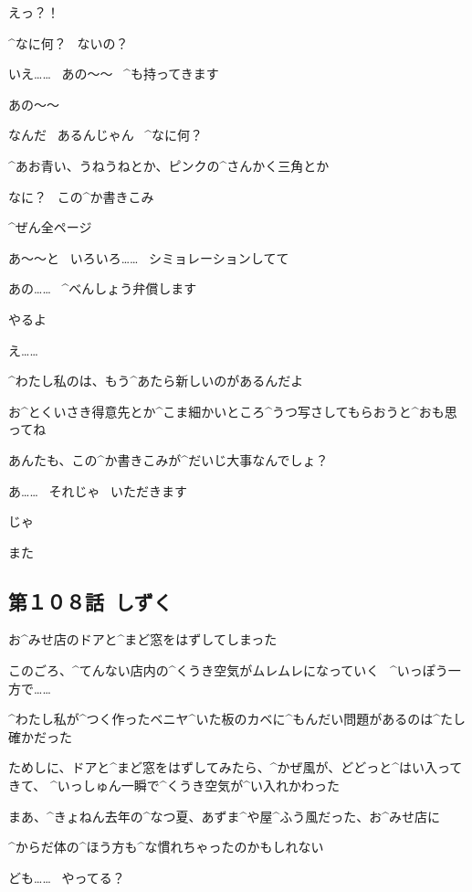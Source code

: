 \Alpha えっ？！

\Maruko ^{なに}{何}？
\ ないの？

\Alpha いえ……
\ あの〜〜
\ ^{も}{持}ってきます

\page[114]
\Alpha あの〜〜

\Maruko なんだ
\ あるんじゃん
\ ^{なに}{何}？

\Maruko ^{あお}{青}い、うねうねとか、ピンクの^{さんかく}{三角}とか

\Maruko なに？
\ この^{か}{書}きこみ

\Maruko ^{ぜん}{全}ページ

\Alpha あ〜〜と
\ いろいろ……
\ シミョレーションしてて

\page[115]
\Alpha あの……
\ ^{べんしょう}{弁償}します

\Maruko やるよ

\Alpha え……

\Maruko ^{わたし}{私}のは、もう^{あたら}{新}しいのがあるんだよ

\Maruko お^{とくいさき}{得意先}とか^{こま}{細}かいところ^{うつ}{写}さしてもらおうと^{おも}{思}ってね

\Maruko あんたも、この^{か}{書}きこみが^{だいじ}{大事}なんでしょ？

\Alpha あ……
\ それじゃ
\ いただきます

\page[116]
\Maruko じゃ

\Alpha また


\subsection{第１０８話\ しずく}

\page[118]
\Alpha お^{みせ}{店}のドアと^{まど}{窓}をはずしてしまった

\page[119]
\Alpha このごろ、^{てんない}{店内}の^{くうき}{空気}がムレムレになっていく
\ ^{いっぽう}{一方}で……

\Alpha ^{わたし}{私}が^{つく}{作}ったベニヤ^{いた}{板}のカベに^{もんだい}{問題}があるのは^{たし}{確}かだった

\Alpha ためしに、ドアと^{まど}{窓}をはずしてみたら、^{かぜ}{風}が、どどっと^{はい}{入}ってきて、
^{いっしゅん}{一瞬}で^{くうき}{空気}が^{い}{入}れかわった

\Alpha まあ、^{きょねん}{去年}の^{なつ}{夏}、あずま^{や}{屋}^{ふう}{風}だった、お^{みせ}{店}に

\Alpha ^{からだ}{体}の^{ほう}{方}も^{な}{慣}れちゃったのかもしれない

\page[120]
\Person ども……
\ やってる？

